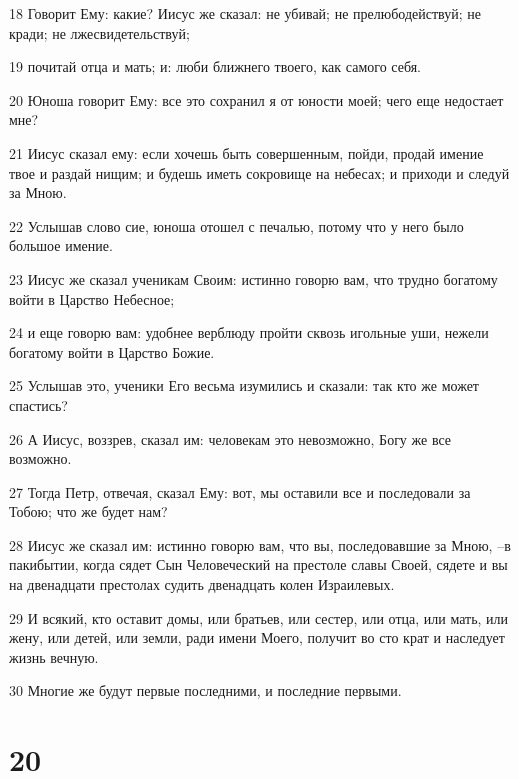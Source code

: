 \par 18 Говорит Ему: какие? Иисус же сказал: не убивай; не прелюбодействуй; не кради; не лжесвидетельствуй;
\par 19 почитай отца и мать; и: люби ближнего твоего, как самого себя.
\par 20 Юноша говорит Ему: все это сохранил я от юности моей; чего еще недостает мне?
\par 21 Иисус сказал ему: если хочешь быть совершенным, пойди, продай имение твое и раздай нищим; и будешь иметь сокровище на небесах; и приходи и следуй за Мною.
\par 22 Услышав слово сие, юноша отошел с печалью, потому что у него было большое имение.
\par 23 Иисус же сказал ученикам Своим: истинно говорю вам, что трудно богатому войти в Царство Небесное;
\par 24 и еще говорю вам: удобнее верблюду пройти сквозь игольные уши, нежели богатому войти в Царство Божие.
\par 25 Услышав это, ученики Его весьма изумились и сказали: так кто же может спастись?
\par 26 А Иисус, воззрев, сказал им: человекам это невозможно, Богу же все возможно.
\par 27 Тогда Петр, отвечая, сказал Ему: вот, мы оставили все и последовали за Тобою; что же будет нам?
\par 28 Иисус же сказал им: истинно говорю вам, что вы, последовавшие за Мною, --в пакибытии, когда сядет Сын Человеческий на престоле славы Своей, сядете и вы на двенадцати престолах судить двенадцать колен Израилевых.
\par 29 И всякий, кто оставит домы, или братьев, или сестер, или отца, или мать, или жену, или детей, или земли, ради имени Моего, получит во сто крат и наследует жизнь вечную.
\par 30 Многие же будут первые последними, и последние первыми.

\chapter{20}

